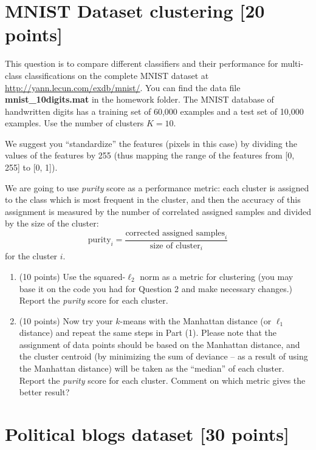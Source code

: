 \documentclass[twoside,10pt]{article}
\begin{document}
\section{MNIST Dataset clustering [20 points]}


This question is to compare different classifiers and their performance for multi-class classifications on the complete MNIST dataset at \url{http://yann.lecun.com/exdb/mnist/}. You can find the data file \textbf{mnist\_10digits.mat} in the homework folder. The MNIST database of handwritten digits has a training set of 60,000 examples and a test set of 10,000 examples. Use the number of clusters $K = 10$.



We suggest you ``standardize'' the features (pixels in this case) by dividing the values of the features by 255 (thus mapping the range of the features from [0, 255] to [0, 1]).

We are going to use  {\it purity} score as a performance metric: each cluster is assigned to the class which is most frequent in the cluster, and then the accuracy of this assignment is measured by the number of correlated assigned samples and divided by the size of the cluster: 
\[
\mbox{purity}_i = \frac{\mbox{corrected assigned samples}_i}{\mbox{size of cluster}_i}
\]
for the cluster $i$. 

\begin{enumerate}

\item (10 points) Use the squared-$\ell_2$ norm as a metric for clustering (you may base it on the code you had for Question 2 and make necessary changes.) 
%
Report the {\it purity} score for each cluster. 

\item (10 points) Now try your $k$-means with the Manhattan distance (or $\ell_1$ distance) and repeat the same steps in Part (1). Please note that the assignment of data points should be based on the Manhattan distance, and the cluster centroid (by minimizing the sum of deviance -- as a result of using the Manhattan distance) will be taken as the ``median'' of each cluster. Report the {\it purity} score for each cluster. Comment on which metric gives the better result?

\end{enumerate}







\section{Political blogs dataset [30 points]}
\end{document}
